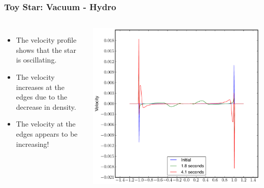 \documentclass{beamer}
\begin{document}
\begin{frame}
\frametitle{Toy Star: Vacuum - Hydro}
\begin{columns}
\begin{itemize}
\item{The velocity profile shows that the star is oscillating.}
\item{The velocity increases at the edges due to the decrease in density.}
\item{The velocity at the edges appears to be increasing!}
\end{itemize}
\centering
\includegraphics[width=\textwidth]{../images/toy_velocity}
\end{columns}
\end{frame}
\end{document}
